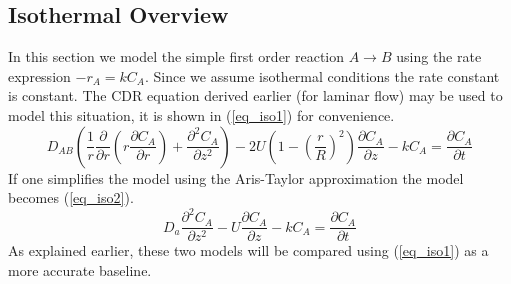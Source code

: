 \documentclass[11pt,fleqn]{article}
\theoremstyle{defstyle}
\begin{document}
\subsection{Isothermal Overview}
In this section we model the simple first order reaction $A \rightarrow B$ using the rate expression $-r_A=kC_A$. Since we assume isothermal conditions the rate constant is constant. The CDR equation derived earlier (for laminar flow) may be used to model this situation, it is shown in (\ref{eq_iso1}) for convenience.
\begin{equation}
D_{AB}\left(\frac{1}{r}\frac{\partial}{\partial r}\left(r\frac{\partial C_A}{\partial r}\right) + \frac{\partial^2 C_A}{\partial z^2}\right) - 2U\left(1-\left(\frac{r}{R}\right)^2\right)\frac{\partial C_A}{\partial z} - kC_A = \frac{\partial C_A}{\partial t}
\label{eq_iso1}
\end{equation} 
If one simplifies the model using the Aris-Taylor approximation the model becomes (\ref{eq_iso2}).
\begin{equation}
D_a \frac{\partial^2 C_A}{\partial z^2} - U \frac{\partial C_A}{\partial z} - kC_A = \frac{\partial C_A}{\partial t}
\label{eq_iso2}
\end{equation}
As explained earlier, these two models will be compared using (\ref{eq_iso1}) as a more accurate baseline.
\end{document}
